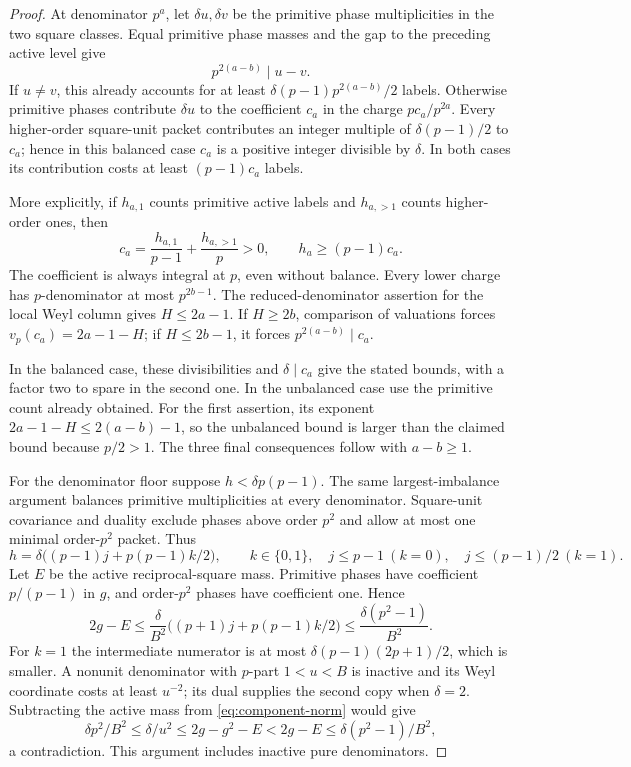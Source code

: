 \documentclass[11pt]{amsart}
\numberwithin{equation}{section}
\theoremstyle{definition}
\theoremstyle{plain}
\begin{document}
\begin{proof}
At denominator $p^a$, let $\delta u,\delta v$ be the primitive
phase multiplicities in the two square classes. Equal primitive
phase masses and the gap to the preceding active level give
\[
                      p^{2(a-b)}\mid u-v.
\]
If $u\ne v$, this already accounts for at least
$\delta(p-1)p^{2(a-b)}/2$ labels. Otherwise primitive phases
contribute $\delta u$ to the coefficient $c_a$ in the charge
$pc_a/p^{2a}$. Every higher-order square-unit packet contributes
an integer multiple of $\delta(p-1)/2$ to $c_a$; hence in this
balanced case $c_a$ is a positive integer divisible by $\delta$.
In both cases its contribution costs at least $(p-1)c_a$ labels.

More explicitly, if $h_{a,1}$ counts primitive active labels and
$h_{a,>1}$ counts higher-order ones, then
\[
 c_a=\frac{h_{a,1}}{p-1}+\frac{h_{a,>1}}p>0,
 \qquad h_a\ge(p-1)c_a.
\]
The coefficient is always integral at $p$, even without balance.
Every lower charge has $p$-denominator at most $p^{2b-1}$.
The reduced-denominator assertion for the local Weyl column gives
$H\le2a-1$. If $H\ge2b$, comparison of valuations forces
$v_p(c_a)=2a-1-H$; if $H\le2b-1$, it forces
$p^{2(a-b)}\mid c_a$.

In the balanced case, these divisibilities and $\delta\mid c_a$
give the stated bounds, with a factor two to spare in the second
one. In the unbalanced case use the primitive count already
obtained. For the first assertion, its exponent
$2a-1-H\le2(a-b)-1$, so the unbalanced bound is larger than
the claimed bound because $p/2>1$. The three final consequences
follow with $a-b\ge1$.


For the denominator floor suppose $h<\delta p(p-1)$. The same
largest-imbalance argument balances primitive multiplicities at every
denominator. Square-unit covariance and duality exclude phases above
order $p^2$ and allow at most one minimal order-$p^2$ packet. Thus
\[
 h=\delta\bigl((p-1)j+p(p-1)k/2\bigr),\qquad
 k\in\{0,1\},\quad
 j\le p-1\ (k=0),\quad j\le(p-1)/2\ (k=1).
\]
Let $E$ be the active reciprocal-square mass. Primitive phases
have coefficient $p/(p-1)$ in $g$, and order-$p^2$ phases have
coefficient one. Hence
\[
 2g-E\le\frac{\delta}{B^2}
       \bigl((p+1)j+p(p-1)k/2\bigr)
 \le\frac{\delta(p^2-1)}{B^2}.
\]
For $k=1$ the intermediate numerator is at most
$\delta(p-1)(2p+1)/2$, which is smaller. A nonunit denominator
with $p$-part $1<u<B$ is inactive and its Weyl coordinate costs
at least $u^{-2}$; its dual supplies the second copy when
$\delta=2$. Subtracting the active mass from
\eqref{eq:component-norm} would give
\[
 \delta p^2/B^2\le\delta/u^2\le2g-g^2-E
 <2g-E\le\delta(p^2-1)/B^2,
\]
a contradiction. This argument includes inactive pure denominators.
\end{proof}
\end{document}
